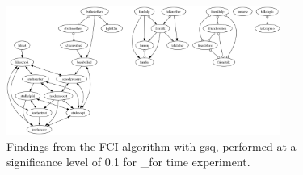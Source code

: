 \begin{figure}[htbp]
    \centering
    \includegraphics[width=0.8\textwidth]{Report/final_report/pictures/FCI_gsq_0.1__for time experiment.png}
    \caption{Findings from the FCI algorithm with gsq, performed at a significance level of 0.1 for _for time experiment.}
    \label{fig:fci_gsq_0.1_for time experiment}
\end{figure}
